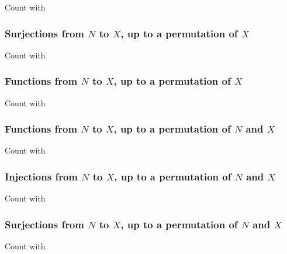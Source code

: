 Count with 

\subsubsection{Surjections from $N$ to $X$, up to a permutation of $X$}

Count with 

\subsubsection{Functions from $N$ to $X$, up to a permutation of $X$}

Count with 

\subsubsection{Functions from $N$ to $X$, up to a permutation of $N$ and $X$}

Count with 

\subsubsection{Injections from $N$ to $X$, up to a permutation of $N$ and $X$}

Count with 

\subsubsection{Surjections from $N$ to $X$, up to a permutation of $N$ and $X$}

Count with 